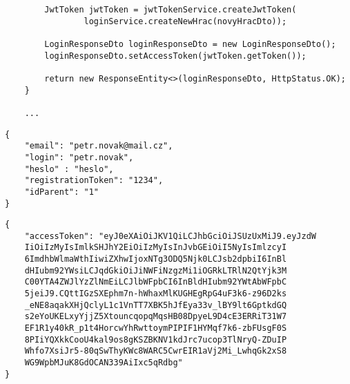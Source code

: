 \documentclass[twoside, 12pt]{article}
\begin{document}
{{\begin{lstlisting}
        JwtToken jwtToken = jwtTokenService.createJwtToken(
                loginService.createNewHrac(novyHracDto));

        LoginResponseDto loginResponseDto = new LoginResponseDto();
        loginResponseDto.setAccessToken(jwtToken.getToken());

        return new ResponseEntity<>(loginResponseDto, HttpStatus.OK);
    }

    ...

\end{lstlisting}

\clearpage


\vspace{10}



\vspace{10}


\begin{lstlisting}
{
    "email": "petr.novak@mail.cz",
    "login": "petr.novak",
    "heslo" : "heslo",
    "registrationToken": "1234",
    "idParent": "1"
}
\end{lstlisting}

\vspace{10}


\begin{lstlisting}
{
    "accessToken": "eyJ0eXAiOiJKV1QiLCJhbGciOiJSUzUxMiJ9.eyJzdW
    IiOiIzMyIsImlkSHJhY2EiOiIzMyIsInJvbGEiOiI5NyIsImlzcyI
    6ImdhbWlmaWthIiwiZXhwIjoxNTg3ODQ5Njk0LCJsb2dpbiI6InBl
    dHIubm92YWsiLCJqdGkiOiJiNWFiNzgzMi1iOGRkLTRlN2QtYjk3M
    C00YTA4ZWJlYzZlNmEiLCJlbWFpbCI6InBldHIubm92YWtAbWFpbC
    5jeiJ9.CQttIGzSXEphm7n-hWhaxMlKUGHEgRpG4uF3k6-z96D2ks
    _eNE8aqakXHjQclyL1c1VnTT7XBK5hJfEya33v_lBY9lt6GptkdGQ
    s2eYoUKELxyYjjZ5XtouncqopqMqsHB08DpyeL9D4cE3ERRiT31W7
    EF1R1y40kR_p1t4HorcwYhRwttoymPIPIF1HYMqf7k6-zbFUsgF0S
    8PIiYQXkkCooU4kal9os8gKSZBKNV1kdJrc7ucop3TlNryQ-ZDuIP
    Whfo7XsiJr5-80qSwThyKWc8WARC5CwrEIR1aVj2Mi_LwhqGk2xS8
    WG9WpbMJuK8GdOCAN339AiIxc5qRdbg"
}
\end{lstlisting}



}}
\end{document}
